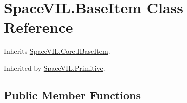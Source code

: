 \hypertarget{class_space_v_i_l_1_1_base_item}{}\section{Space\+V\+I\+L.\+Base\+Item Class Reference}
\label{class_space_v_i_l_1_1_base_item}


Inherits \mbox{\hyperlink{interface_space_v_i_l_1_1_core_1_1_i_base_item}{Space\+V\+I\+L.\+Core.\+I\+Base\+Item}}.



Inherited by \mbox{\hyperlink{class_space_v_i_l_1_1_primitive}{Space\+V\+I\+L.\+Primitive}}.

\subsection*{Public Member Functions}
